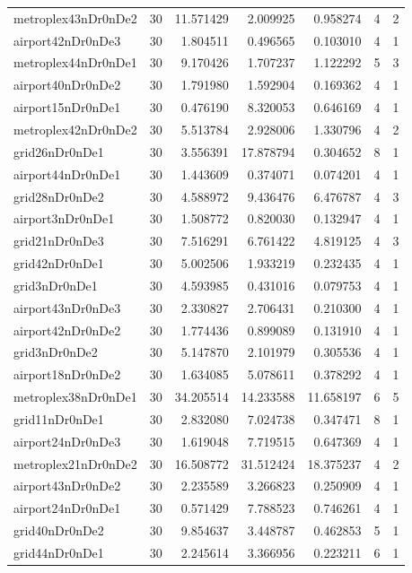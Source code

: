 \begin{longtable}{|l|r|r|r|r|r|r|}
metroplex43nDr0nDe2 & 30 & 11.571429 & 2.009925 & 0.958274 & 4 & 2 \\
airport42nDr0nDe3 & 30 & 1.804511 & 0.496565 & 0.103010 & 4 & 1 \\
metroplex44nDr0nDe1 & 30 & 9.170426 & 1.707237 & 1.122292 & 5 & 3 \\
airport40nDr0nDe2 & 30 & 1.791980 & 1.592904 & 0.169362 & 4 & 1 \\
airport15nDr0nDe1 & 30 & 0.476190 & 8.320053 & 0.646169 & 4 & 1 \\
metroplex42nDr0nDe2 & 30 & 5.513784 & 2.928006 & 1.330796 & 4 & 2 \\
grid26nDr0nDe1 & 30 & 3.556391 & 17.878794 & 0.304652 & 8 & 1 \\
airport44nDr0nDe1 & 30 & 1.443609 & 0.374071 & 0.074201 & 4 & 1 \\
grid28nDr0nDe2 & 30 & 4.588972 & 9.436476 & 6.476787 & 4 & 3 \\
airport3nDr0nDe1 & 30 & 1.508772 & 0.820030 & 0.132947 & 4 & 1 \\
grid21nDr0nDe3 & 30 & 7.516291 & 6.761422 & 4.819125 & 4 & 3 \\
grid42nDr0nDe1 & 30 & 5.002506 & 1.933219 & 0.232435 & 4 & 1 \\
grid3nDr0nDe1 & 30 & 4.593985 & 0.431016 & 0.079753 & 4 & 1 \\
airport43nDr0nDe3 & 30 & 2.330827 & 2.706431 & 0.210300 & 4 & 1 \\
airport42nDr0nDe2 & 30 & 1.774436 & 0.899089 & 0.131910 & 4 & 1 \\
grid3nDr0nDe2 & 30 & 5.147870 & 2.101979 & 0.305536 & 4 & 1 \\
airport18nDr0nDe2 & 30 & 1.634085 & 5.078611 & 0.378292 & 4 & 1 \\
metroplex38nDr0nDe1 & 30 & 34.205514 & 14.233588 & 11.658197 & 6 & 5 \\
grid11nDr0nDe1 & 30 & 2.832080 & 7.024738 & 0.347471 & 8 & 1 \\
airport24nDr0nDe3 & 30 & 1.619048 & 7.719515 & 0.647369 & 4 & 1 \\
metroplex21nDr0nDe2 & 30 & 16.508772 & 31.512424 & 18.375237 & 4 & 2 \\
airport43nDr0nDe2 & 30 & 2.235589 & 3.266823 & 0.250909 & 4 & 1 \\
airport24nDr0nDe1 & 30 & 0.571429 & 7.788523 & 0.746261 & 4 & 1 \\
grid40nDr0nDe2 & 30 & 9.854637 & 3.448787 & 0.462853 & 5 & 1 \\
grid44nDr0nDe1 & 30 & 2.245614 & 3.366956 & 0.223211 & 6 & 1 \\

\end{longtable}

